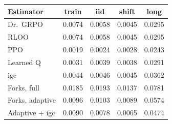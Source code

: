 \begin{tabular}{lcccc}
\toprule
Estimator & train & iid & shift & long\\
\midrule
Dr.~GRPO & 0.0074 & 0.0058 & 0.0045 & 0.0295 \\
RLOO & 0.0074 & 0.0058 & 0.0045 & 0.0295 \\
PPO & 0.0019 & 0.0024 & 0.0028 & 0.0243 \\
Learned Q & 0.0031 & 0.0039 & 0.0038 & 0.0291 \\
igc & 0.0044 & 0.0046 & 0.0045 & 0.0362 \\
Forks, full & 0.0185 & 0.0193 & 0.0137 & 0.0781 \\
Forks, adaptive & 0.0096 & 0.0103 & 0.0089 & 0.0574 \\
Adaptive + igc & 0.0090 & 0.0078 & 0.0065 & 0.0474 \\
\bottomrule
\end{tabular}
